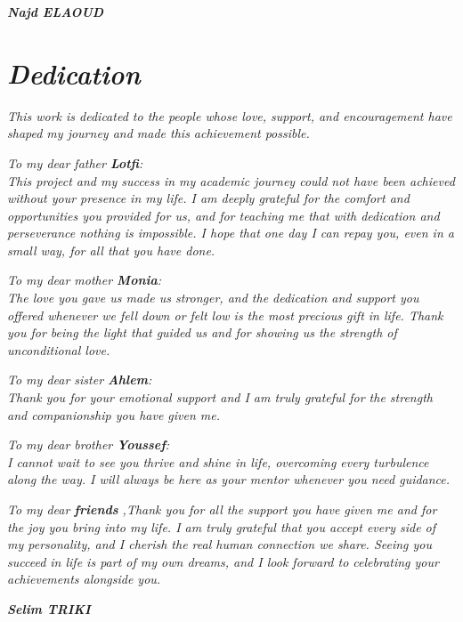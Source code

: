 \vspace{1cm}
\hfill{\large \emph{\textbf{\textit{ Najd ELAOUD}}}}


\clearpage
\chapter*{{\emph{\huge{Dedication}}}}

\vspace{-2cm}

\begin{center}
\emph{This work is dedicated to the people whose love, support, and encouragement have shaped my journey and made this achievement possible.}
\end{center}
    
\begin{center}

    \emph{To my dear father \textbf{Lotfi}:\\
This project and my success in my academic journey could not have been achieved without your presence in my life. I am deeply grateful for the comfort and opportunities you provided for us, and for teaching me that with dedication and perseverance nothing is impossible. I hope that one day I can repay you, even in a small way, for all that you have done.}
\end{center}

\begin{center} 
 \emph{To my dear mother \textbf{Monia}:\\
    The love you gave us made us stronger, and the dedication and support you offered whenever we fell down or felt low is the most precious gift in life. Thank you for being the light that guided us and for showing us the strength of unconditional love.}

\end{center}

\begin{center}
    \emph{To my dear sister \textbf{Ahlem}:\\
   Thank you for your emotional support  and I am truly grateful for the strength and companionship you have given me.}
\end{center}

\begin{center}
    \emph{To my dear brother \textbf{Youssef}:\\
  I cannot wait to see you thrive and shine in life, overcoming every turbulence along the way. I will always be here as your mentor whenever you need guidance.}
\end{center}

\begin{center}
    \emph{To my dear \textbf{friends}  ,Thank you for all the support you have given me and for the joy you bring into my life. I am truly grateful that you accept every side of my personality, and I cherish the real human connection we share. Seeing you succeed in life is part of my own dreams, and I look forward to celebrating your achievements alongside you.
    }
    
\end{center}
\vspace{1cm}
\hfill{\large \emph{\textbf{\textit{ Selim TRIKI}}}}